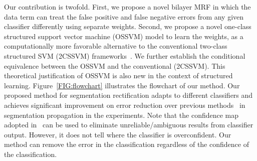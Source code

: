 \documentclass[10pt,journal,compsoc]{newIEEEtran}
\begin{document}
Our contribution is twofold. First, we propose a novel bilayer MRF in which the data term can treat the false positive and false negative errors from any given classifier differently using separate weights. Second, we propose a novel one-class structured support vector machine (OSSVM) model to learn the weights, as a computationally more favorable alternative to the conventional two-class structured SVM (2CSSVM) frameworks~\cite{Taskar05LargeMargin,Tsochantaridis05LargeMarginSSVM}. We further establish the conditional equivalence between the OSSVM and the conventional (2CSSVM). This theoretical justification of OSSVM is also new in the context of structured learning. Figure~\ref{FIG:flowchart} illustrates the flowchart of our method.
Our proposed method for segmentation rectification adapts to different classifiers and achieves significant improvement on error reduction over previous methods~\cite{Zhong2012UDC_SIGGRAPHAsia,Bai09VideoSnapCut_SIGGRAPH} in segmentation propagation in the experiments. Note that the {confidence map} adopted in~\cite{Zhong2012UDC_SIGGRAPHAsia} can be used to eliminate unreliable/ambiguous results from classifier output. However, it does not tell where the classifier is overconfident. Our method can remove the error in the classification regardless of the confidence of the classification.
\end{document}
